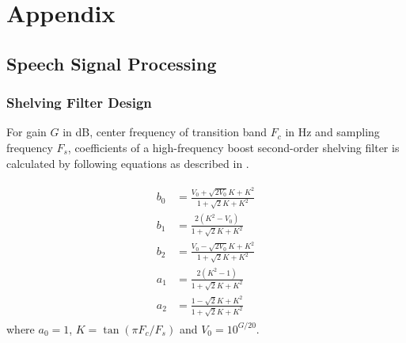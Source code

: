 \appendix
\chapter{Appendix}


\section{Speech Signal Processing}

\subsection{Shelving Filter Design}
\label{shelving-appendix}
For gain $G$ in dB, center frequency of transition band $F_c$ in Hz and sampling frequency $F_s$, coefficients of a high-frequency boost second-order shelving filter is calculated by following equations as described in \cite{DAFX_book}.

\begin{align}
\begin{split}
b_0 &= \frac{V_0 + \sqrt{2V_0} K + K^2}{1 + \sqrt{2} K + K^2}\\
b_1 &= \frac{2 (K^2 - V_0)}{1 + \sqrt{2} K + K^2}\\
b_2 &= \frac{V_0 - \sqrt{2V_0} K + K^2}{1 + \sqrt{2} K + K^2}\\
a_1 &= \frac{2 (K^2 - 1)}{1 + \sqrt{2} K + K^2}\\
a_2 &= \frac{1 - \sqrt{2}K + K^2}{1 + \sqrt{2}K + K^2}
\end{split}
\end{align}
where $a_0 = 1$, $K = \tan(\pi F_c / F_s)$ and $V_0 = 10^{G/20}$.


